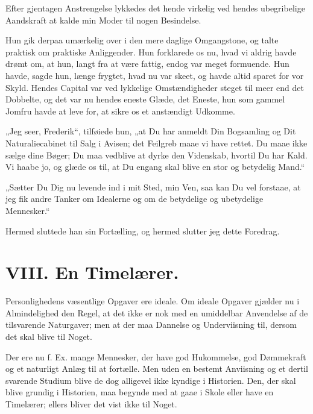 \documentclass[12pt,a4paper]{book}
\newcommand{\apage}[1]{\marginnote{\footnotesize\textit{[#1]}}}
\begin{document}
Efter gjentagen Anstrengelse lykkedes det hende virkelig ved hendes ubegribelige Aandskraft at kalde min Moder til nogen Besindelse.

Hun gik derpaa umærkelig over i den mere daglige Omgangstone, og talte praktisk om praktiske Anliggender. Hun forklarede os nu, hvad vi aldrig havde drømt om, at hun, langt fra at være fattig, endog var meget formuende. Hun havde, sagde hun, længe frygtet, hvad nu var skeet, og havde altid sparet for vor Skyld. Hendes Capital var ved lykkelige \apage{79}
Omstændigheder steget til meer end det Dobbelte, og det var nu hendes eneste Glæde, det Eneste, hun som gammel Jomfru havde at leve for, at sikre os et anstændigt Udkomme.

„Jeg seer, Frederik“, tilføiede hun, „at Du har anmeldt Din Bogsamling og Dit Naturaliecabinet til Salg i Avisen; det Feilgreb maae vi have rettet. Du maae ikke sælge dine Bøger; Du maa vedblive at dyrke den Videnskab, hvortil Du har Kald. Vi haabe jo, og glæde os til, at Du engang skal blive en stor og betydelig Mand.“

„Sætter Du Dig nu levende ind i mit Sted, min Ven, saa kan Du vel forstaae, at jeg fik andre Tanker om Idealerne og om de betydelige og ubetydelige Mennesker.“

Hermed sluttede han sin Fortælling, og hermed slutter jeg dette Foredrag.

\chapter*{VIII. En Timelærer.}
\label{ch:forel8} \apage{80}

Personlighedens væsentlige Opgaver ere ideale. Om ideale Opgaver
gjælder nu i Almindelighed den Regel, at det ikke er nok med en
umiddelbar Anvendelse af de tilsvarende Naturgaver; men at der maa
Dannelse og Underviisning til, dersom det skal blive til Noget.

Der ere nu f. Ex. mange Mennesker, der have god Hukommelse, god
Dømmekraft og et naturligt Anlæg til at fortælle. Men uden en
bestemt Anviisning og et dertil svarende Studium blive de dog
alligevel ikke kyndige i Historien. Den, der skal blive grundig i
Historien, maa begynde med at gaae i Skole eller have en Timelærer;
ellers bliver det vist ikke til Noget.
\end{document}
